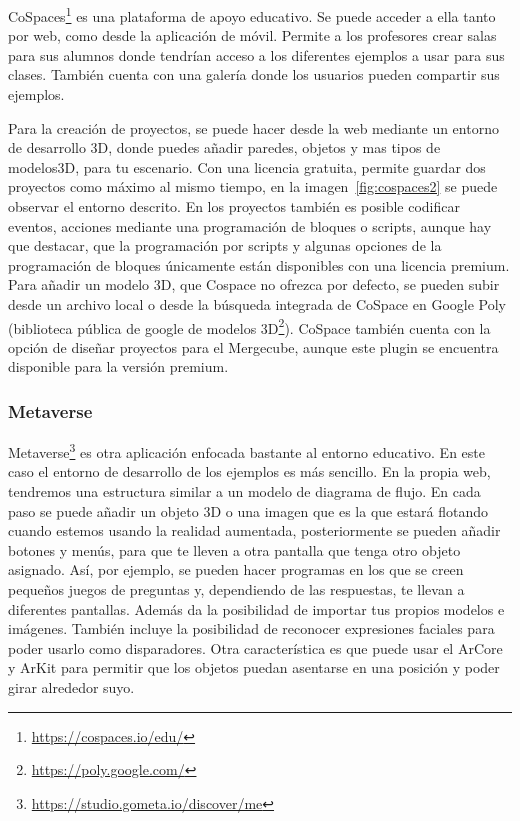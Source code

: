 CoSpaces\footnote{\url{https://cospaces.io/edu/}} es una plataforma de apoyo educativo. Se puede acceder a ella tanto por web, como desde la aplicación de móvil. Permite a los profesores crear salas para sus alumnos donde tendrían acceso a los diferentes ejemplos a usar para sus clases. También cuenta con una galería donde los usuarios pueden compartir sus ejemplos.


Para la creación de proyectos, se puede hacer desde la web mediante un entorno de desarrollo 3D, donde puedes añadir paredes, objetos y mas tipos de modelos3D, para tu escenario. Con una licencia gratuita, permite guardar dos proyectos como máximo al mismo tiempo, en la imagen~\ref{fig:cospaces2} se puede observar el entorno descrito. En los proyectos también es posible codificar eventos, acciones mediante una programación de bloques o scripts, aunque hay que destacar, que la programación por scripts y algunas opciones de la programación de bloques únicamente están disponibles con una licencia premium. Para añadir un modelo 3D, que Cospace no ofrezca por defecto, se pueden subir desde un archivo local o desde la búsqueda integrada de CoSpace en Google Poly (biblioteca pública de google de modelos 3D\footnote{\url{https://poly.google.com/}}).
CoSpace también cuenta con la opción de diseñar proyectos para el Mergecube, aunque este plugin se encuentra disponible para la versión premium.



\subsubsection{Metaverse} 

Metaverse\footnote{\url{https://studio.gometa.io/discover/me}} es otra aplicación enfocada bastante al entorno educativo. En este caso el entorno de desarrollo de los ejemplos es más sencillo. En la propia web, tendremos una estructura similar a un modelo de diagrama de flujo. En cada paso se puede añadir un objeto 3D o una imagen que es la que estará flotando cuando estemos usando la realidad aumentada, posteriormente se pueden añadir botones y menús, para que te lleven a otra pantalla que tenga otro objeto asignado. Así, por ejemplo, se pueden hacer programas en los que se creen pequeños juegos de preguntas y, dependiendo de las respuestas, te llevan a diferentes pantallas.
Además da la posibilidad de importar tus propios modelos e imágenes.
También incluye la posibilidad de reconocer expresiones faciales para poder usarlo como disparadores.
Otra característica es que puede usar el ArCore y ArKit para permitir que los objetos puedan asentarse en una posición y poder girar alrededor suyo.

